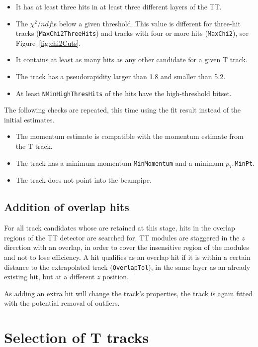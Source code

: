 \begin{itemize}
\item It has at least three hits in at least three different layers of the TT.
\item The $\chi^{2}/ndf$is below a given threshold. This value is different for
three-hit tracks (\texttt{MaxChi2ThreeHits}) and tracks with four or more hits (\texttt{MaxChi2}),
see Figure~\ref{fig:chi2Cuts}. 
\item It contains at least as many hits as any other candidate for a given T track.
\item The track has a pseudorapidity larger than 1.8 and smaller than 5.2.
\item At least \texttt{NMinHighThresHits} of the hits have the high-threshold
bitset.
\end{itemize}

The following checks are repeated, this time using the fit result instead of the initial estimates.

\begin{itemize}
\item The momentum estimate is compatible with the momentum estimate from the
T track.
\item The track has a minimum momentum \texttt{MinMomentum} and a minimum $p_{T}$ \texttt{MinPt}.
\item The track does not point into the beampipe.
\end{itemize}

\subsection{Addition of overlap hits}
\label{sec:addOverlap}
For all track candidates whose are retained at this stage, hits in the overlap
regions of the TT detector are searched for. 
TT modules are staggered in the $z$ direction with an overlap, in order to cover the insensitive region of the modules and not to lose efficiency. A hit qualifies as an overlap hit if it
is within a certain distance to the extrapolated track (\texttt{OverlapTol}), in the same
layer as an already existing hit, but at a
different $z$ position.

As adding an extra hit will change the track's properties, the track
is again fitted with the potential removal of outliers. 


\section{Selection of T tracks }
\label{sec:TSeed}

